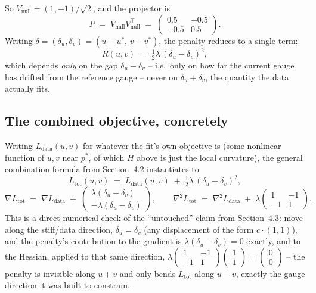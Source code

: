 \documentclass[11pt]{article}
\begin{document}
So $V_{\mathrm{null}} = (1,-1)/\sqrt{2}$, and the projector is
\begin{equation}
  P \;=\; V_{\mathrm{null}}V_{\mathrm{null}}^\top \;=\; \begin{pmatrix}0.5 & -0.5\\ -0.5 & 0.5\end{pmatrix}.
\end{equation}
Writing $\delta = (\delta_u,\delta_v) = (u-u^*,\,v-v^*)$, the penalty reduces
to a single term:
\begin{equation}
  R(u,v) \;=\; \tfrac{1}{2}\lambda\,(\delta_u - \delta_v)^2,
\end{equation}
which depends \emph{only} on the gap $\delta_u - \delta_v$ -- i.e.\ only on
how far the current gauge has drifted from the reference gauge -- never on
$\delta_u+\delta_v$, the quantity the data actually fits.

\subsection*{The combined objective, concretely}

Writing $L_{\mathrm{data}}(u,v)$ for whatever the fit's own objective is
(some nonlinear function of $u,v$ near $p^*$, of which $H$ above is just the
local curvature), the general combination formula from Section~4.2
instantiates to
\begin{equation}
  L_{\mathrm{tot}}(u,v) \;=\; L_{\mathrm{data}}(u,v) \;+\; \tfrac{1}{2}\lambda\,(\delta_u-\delta_v)^2,
\end{equation}
\begin{equation}
  \nabla L_{\mathrm{tot}} \;=\; \nabla L_{\mathrm{data}} \;+\;
  \begin{pmatrix}\lambda(\delta_u-\delta_v)\\[2pt] -\lambda(\delta_u-\delta_v)\end{pmatrix},
  \qquad
  \nabla^2 L_{\mathrm{tot}} \;=\; \nabla^2 L_{\mathrm{data}} \;+\; \lambda\begin{pmatrix}1&-1\\-1&1\end{pmatrix}.
\end{equation}
This is a direct numerical check of the ``untouched'' claim from
Section~4.3: move along the stiff/data direction, $\delta_u=\delta_v$ (any
displacement of the form $c\cdot(1,1)$), and the penalty's contribution to
the gradient is $\lambda(\delta_u-\delta_v)=0$ exactly, and to the Hessian,
applied to that same direction, $\lambda\left(\begin{smallmatrix}1&-1\\-1&1\end{smallmatrix}\right)\left(\begin{smallmatrix}1\\1\end{smallmatrix}\right) = \left(\begin{smallmatrix}0\\0\end{smallmatrix}\right)$
-- the penalty is invisible along $u+v$ and only bends $L_{\mathrm{tot}}$
along $u-v$, exactly the gauge direction it was built to constrain.
\end{document}
